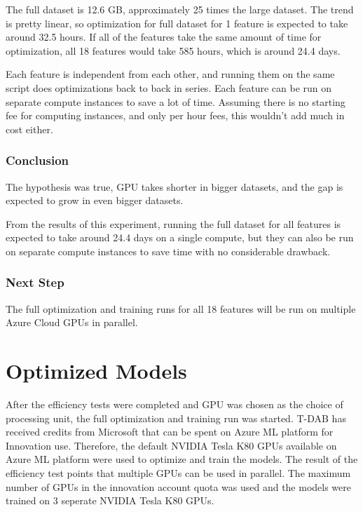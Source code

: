 \documentclass[12pt,twoside]{report}
\begin{document}
The full dataset is 12.6 GB, approximately 25 times the large dataset. The trend is pretty linear, so optimization for full dataset for 1 feature is expected to take around 32.5 hours. If all of the features take the same amount of time for optimization, all 18 features would take 585 hours, which is around 24.4 days.

Each feature is independent from each other, and running them on the same script does optimizations back to back in series. Each feature can be run on separate compute instances to save a lot of time. Assuming there is no starting fee for computing instances, and only per hour fees, this wouldn’t add much in cost either.

\subsubsection{Conclusion}
The hypothesis was true, GPU takes shorter in bigger datasets, and the gap is expected to grow in even bigger datasets.

From the results of this experiment, running the full dataset for all features is expected to take around 24.4 days on a single compute, but they can also be run on separate compute instances to save time with no considerable drawback.

\subsubsection{Next Step}
The full optimization and training runs for all 18 features will be run on multiple Azure Cloud GPUs in parallel.

\section{Optimized Models}

After the efficiency tests were completed and GPU was chosen as the choice of processing unit, the full optimization and training run was started. T-DAB has received credits from Microsoft that can be spent on Azure ML platform for Innovation use. Therefore, the default NVIDIA Tesla K80 GPUs available on Azure ML platform were used to optimize and train the models. The result of the efficiency test points that multiple GPUs can be used in parallel. The maximum number of GPUs in the innovation account quota was used and the models were trained on 3 seperate NVIDIA Tesla K80 GPUs.
\end{document}
